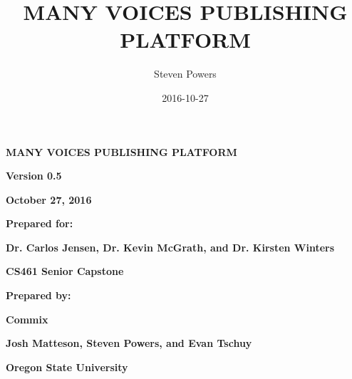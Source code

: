 \documentclass[letterpaper, 10pt, draftclsnofoot, onecolumn]{IEEEtran}
\title{MANY VOICES PUBLISHING PLATFORM}
\author{Steven Powers}
\date{2016-10-27}
\begin{document}
\clearpage\setcounter{page}{1}\pagestyle{Standard}
\thispagestyle{FirstPage}


\bigskip


\bigskip



\bigskip

{\centering{}\bfseries\color{black}
MANY VOICES PUBLISHING PLATFORM
\par}


\bigskip


\bigskip


\bigskip


\bigskip

{\centering{}\bfseries\color{black}
Version 0.5
\par}

{\centering{}\bfseries\color{black}
October 27, 2016
\par}


\bigskip


\bigskip

{\centering{}\bfseries\color{black}
Prepared for:
\par}

{\centering{}\bfseries\color{black}
Dr. Carlos Jensen, Dr. Kevin McGrath, and Dr. Kirsten Winters
\par}

{\centering{}\bfseries\color{black}
CS461 Senior Capstone
\par}


\bigskip


\bigskip

{\centering{}\bfseries\color{black}
Prepared by:
\par}

{\centering{}\bfseries\color{black}
Commix
\par}

{\centering{}\bfseries\color{black}
Josh Matteson, Steven Powers, and Evan Tschuy
\par}

{\centering{}\bfseries\color{black}
Oregon State University
\par}
\end{document}
